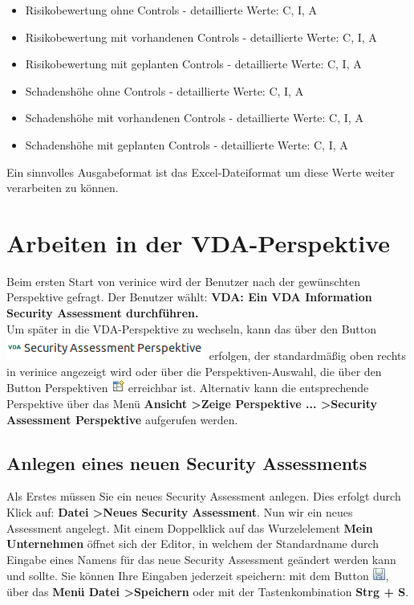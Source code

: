 \documentclass[a4paper,10pt]{book}
\begin{document}
\begin{itemize}
\item Risikobewertung ohne Controls - detaillierte Werte: C, I, A
\item Risikobewertung mit vorhandenen Controls - detaillierte Werte: C, I, A
\item Risikobewertung mit geplanten Controls - detaillierte Werte: C,
  I, A
\item Schadenshöhe ohne Controls - detaillierte Werte: C, I, A
\item Schadenshöhe mit vorhandenen Controls - detaillierte Werte: C,
  I, A
\item Schadenshöhe mit geplanten Controls - detaillierte Werte: C, I,
  A
\end{itemize}

Ein sinnvolles Ausgabeformat ist das Excel-Dateiformat um diese Werte
weiter verarbeiten zu können.

\chapter{Arbeiten in der VDA-Perspektive} \label{Arbeiten in der VDA-Perspektive}
Beim ersten Start von verinice wird der Benutzer nach der gewünschten Perspektive gefragt.
Der Benutzer wählt: \textbf{VDA: Ein VDA Information Security Assessment durchführen.}
\newline\\
Um später in die VDA-Perspektive zu wechseln, kann das über den Button \includegraphics[height=2ex]{Icon/Vda-persp-btn.png} erfolgen,
der standardmäßig oben rechts in verinice angezeigt wird oder über die Perspektiven-Auswahl,
die über den Button Perspektiven \includegraphics[height=2ex]{Icon/New_persp.png} erreichbar ist.
Alternativ kann die entsprechende Perspektive über das Menü \textbf{Ansicht \textgreater Zeige Perspektive ... \textgreater Security Assessment Perspektive} aufgerufen werden.

\section{Anlegen eines neuen Security Assessments}
Als Erstes müssen Sie ein neues Security Assessment anlegen. Dies erfolgt durch Klick auf:
\textbf{Datei \textgreater Neues Security Assessment}. Nun wir ein neues Assessment angelegt. Mit einem Doppelklick auf das Wurzelelement
\textbf{Mein Unternehmen} öffnet sich der Editor, in welchem der Standardname durch Eingabe eines Namens für das neue Security
Assessment geändert werden kann und sollte. Sie können Ihre Eingaben jederzeit speichern: mit dem Button \includegraphics[height=2ex]{Icon/Disk.png},
über das \textbf{Menü Datei \textgreater Speichern} oder mit der Tastenkombination \textbf{Strg + S}.
\end{document}
